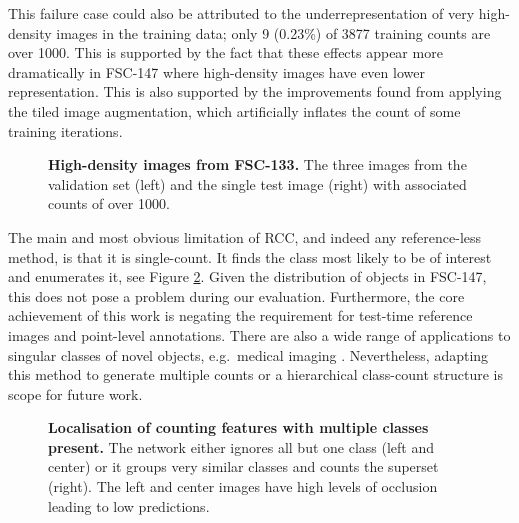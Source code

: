 \documentclass[letterpaper, 11pt]{IEEEtran}
\begin{document}
This failure case could also be attributed to the underrepresentation of very high-density images in the training data; only 9 (0.23\%) of 3877 training counts are over 1000. 
This is supported by the fact that these effects appear more dramatically in FSC-147 where high-density images have even lower representation.
This is also supported by the improvements found from applying the tiled image augmentation, which artificially inflates the count of some training iterations.
\begin{table}
    \centering
    \fontsize{9}{9}\selectfont
    
    \caption{
    \textbf{The effect of removing high-density images from FSC-133.}
    Excluding the small number of very dense images significantly improves our results, showing that these are a weakness of our method.
    \# and \% denote the total number and percentage of images excluded respectively.
    }
    \label{FSC147_exclusions_table}
\end{table}
\begin{figure}
    \centering
    \fontsize{9}{9}\selectfont
    
    \caption{\textbf{High-density images from FSC-133.} The three images from the validation set (left) and the single test image (right) with associated counts of over 1000. 
    }
    \label{FSC147_exclusions_figure}
\end{figure}

The main and most obvious limitation of RCC, and indeed any reference-less method, is that it is single-count. It finds the class most likely to be of interest and enumerates it, see Figure \ref{figure_multiclass}. Given the distribution of objects in FSC-147, this does not pose a problem during our evaluation.
Furthermore, the core achievement of this work is negating the requirement for test-time reference images and point-level annotations. There are also a wide range of applications to singular classes of novel objects, e.g.\ medical imaging \cite{xie2018microscopy}.
Nevertheless, adapting this method to generate multiple counts or a hierarchical class-count structure is scope for future work.
\begin{figure}
    \centering
       
    \caption{\textbf{Localisation of counting features with multiple classes present.} 
    The network either ignores all but one class (left and center) or it groups very similar classes and counts the superset (right). The left and center images have high levels of occlusion leading to low predictions.
    }
    \label{figure_multiclass}
\end{figure}
\end{document}
